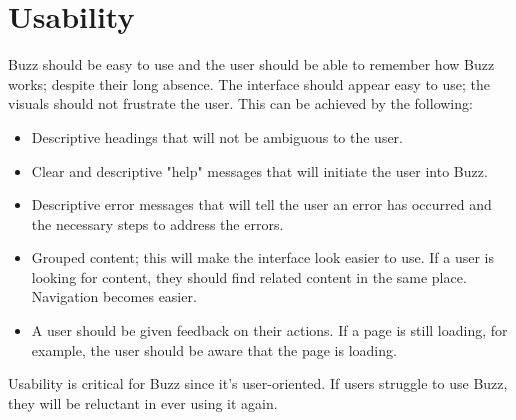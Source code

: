\documentclass{article}
\begin{document}
\section{Usability} \par Buzz should be easy to use and the user should be able to remember how Buzz works; despite their long absence. The interface should appear easy to use; the visuals should not frustrate the user.
This can be achieved by the following:
\begin{itemize}
\item Descriptive headings that will not be ambiguous to the user.
\item Clear and descriptive "help" messages that will initiate the user into Buzz. 
\item Descriptive error messages that will tell the user an error has occurred and the necessary steps to address the errors.
\item Grouped content; this will make the interface look easier to use. If a user is looking for content, they should find related content in the same place. Navigation becomes easier.
\item A user should be given feedback on their actions. If a page is still loading, for example, the user should be aware that the page is loading.
\end{itemize} 
Usability is critical for Buzz since it's user-oriented. If users struggle to use Buzz, they will be reluctant in ever using it again.
\end{document}
